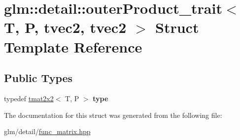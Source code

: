 \hypertarget{structglm_1_1detail_1_1outerProduct__trait_3_01T_00_01P_00_01tvec2_00_01tvec2_01_4}{\section{glm\-:\-:detail\-:\-:outer\-Product\-\_\-trait$<$ T, P, tvec2, tvec2 $>$ Struct Template Reference}
\label{structglm_1_1detail_1_1outerProduct__trait_3_01T_00_01P_00_01tvec2_00_01tvec2_01_4}
}
\subsection*{Public Types}
\begin{DoxyCompactItemize}
\item 
\hypertarget{structglm_1_1detail_1_1outerProduct__trait_3_01T_00_01P_00_01tvec2_00_01tvec2_01_4_a390fb582fa7caa73e53f69181b3b334e}{typedef \hyperlink{structglm_1_1tmat2x2}{tmat2x2}$<$ T, P $>$ {\bfseries type}}\label{structglm_1_1detail_1_1outerProduct__trait_3_01T_00_01P_00_01tvec2_00_01tvec2_01_4_a390fb582fa7caa73e53f69181b3b334e}

\end{DoxyCompactItemize}


The documentation for this struct was generated from the following file\-:\begin{DoxyCompactItemize}
\item 
glm/detail/\hyperlink{func__matrix_8hpp}{func\-\_\-matrix.\-hpp}\end{DoxyCompactItemize}
